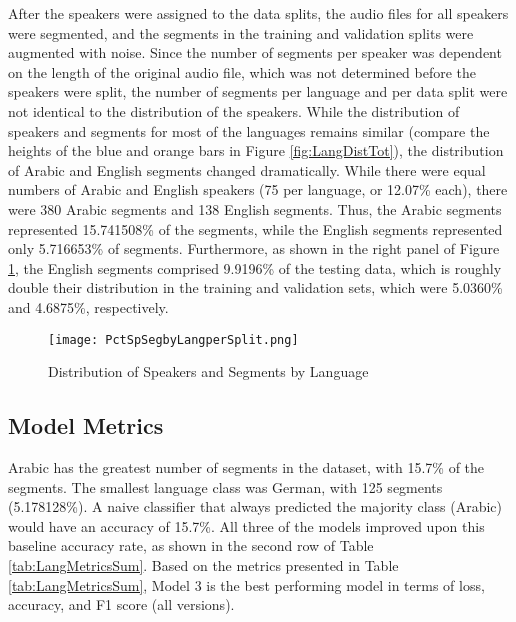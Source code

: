 \documentclass[11pt, letterpaper]{article}
\begin{document}
After the speakers were assigned to the data splits, the audio files for all speakers were segmented, and the segments in the training and validation splits were augmented with noise. Since the number of segments per speaker was dependent on the length of the original audio file, which was not determined before the speakers were split, the number of segments per language and per data split were not identical to the distribution of the speakers. While the distribution of speakers and segments for most of the languages remains similar (compare the heights of the blue and orange bars in Figure \ref{fig:LangDistTot}), the distribution of Arabic and English segments changed dramatically. While there were equal numbers of Arabic and English speakers (75 per language, or 12.07\% each), there were 380 Arabic segments and 138 English segments. Thus, the Arabic segments represented 15.741508\% of the segments, while the English segments represented only 5.716653\% of segments. Furthermore, as shown in the right panel of Figure \ref{fig:LangDist}, the English segments comprised 9.9196\% of the testing data, which is roughly double their distribution in the training and validation sets, which were 5.0360\% and 4.6875\%, respectively.

\begin{figure}[h]
\begin{center}
\texttt{[image: PctSpSegbyLangperSplit.png]}
\caption{Distribution of Speakers and Segments by Language}
\label{fig:LangDist}
\end{center}
\end{figure}

\subsection{Model Metrics}
Arabic has the greatest number of segments in the dataset, with 15.7\% of the segments. The smallest language class was German, with 125 segments (5.178128\%). A naive classifier that always predicted the majority class (Arabic) would have an accuracy of 15.7\%.  All three of the models improved upon this baseline accuracy rate, as shown in the second row of Table \ref{tab:LangMetricsSum}. Based on the metrics presented in Table \ref{tab:LangMetricsSum}, Model 3 is the best performing model in terms of loss, accuracy, and F1 score (all versions).
\end{document}
